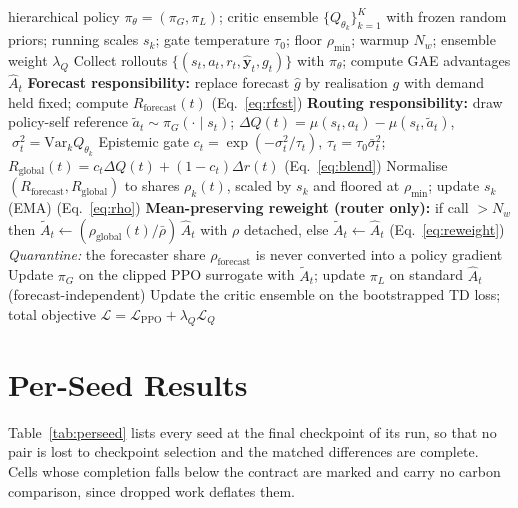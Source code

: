 \documentclass{article} %
\begin{document}
\begin{algorithm}[t]
\caption{EU-CRD training (one PPO iteration)}
\label{alg:eucrd}
\begin{algorithmic}[1]
\REQUIRE hierarchical policy $\pi_\theta=(\pi_G,\pi_L)$; critic ensemble $\{Q_{\theta_k}\}_{k=1}^{K}$ with frozen random priors; running scales $s_k$; gate temperature $\tau_0$; floor $\rho_{\min}$; warmup $N_w$; ensemble weight $\lambda_Q$
\STATE Collect rollouts $\{(s_t,a_t,r_t,\hat{\mathbf{y}}_t,g_t)\}$ with $\pi_\theta$; compute GAE advantages $\hat{A}_t$
  \STATE \textbf{Forecast responsibility:} replace forecast $\hat g$ by realisation $g$ with demand held fixed; compute $R_{\text{forecast}}(t)$ \hfill (Eq.~\ref{eq:rfcst})
  \STATE \textbf{Routing responsibility:} draw policy-self reference $\tilde a_t\!\sim\!\pi_G(\cdot\mid s_t)$; $\Delta Q(t)\!=\!\mu(s_t,a_t)\!-\!\mu(s_t,\tilde a_t)$, $\;\sigma^2_t\!=\!\mathrm{Var}_k Q_{\theta_k}$
  \STATE Epistemic gate $c_t\!=\!\exp(-\sigma^2_t/\tau_t)$, $\tau_t\!=\!\tau_0\bar\sigma^2_t$;\quad $R_{\text{global}}(t)\!=\!c_t\Delta Q(t)+(1\!-\!c_t)\Delta r(t)$ \hfill (Eq.~\ref{eq:blend})
  \STATE Normalise $(R_{\text{forecast}},R_{\text{global}})$ to shares $\rho_k(t)$, scaled by $s_k$ and floored at $\rho_{\min}$; update $s_k$ (EMA) \hfill (Eq.~\ref{eq:rho})
\ENDFOR
\STATE \textbf{Mean-preserving reweight (router only):} if call $>N_w$ then $\tilde A_t\!\leftarrow\!(\rho_{\text{global}}(t)/\bar\rho)\,\hat A_t$ with $\rho$ detached, else $\tilde A_t\!\leftarrow\!\hat A_t$ \hfill (Eq.~\ref{eq:reweight})
\STATE \emph{Quarantine:} the forecaster share $\rho_{\text{forecast}}$ is never converted into a policy gradient
\STATE Update $\pi_G$ on the clipped PPO surrogate with $\tilde A_t$; update $\pi_L$ on standard $\hat A_t$ (forecast-independent)
\STATE Update the critic ensemble on the bootstrapped TD loss; total objective $\mathcal{L}=\mathcal{L}_{\text{PPO}}+\lambda_Q\mathcal{L}_Q$
\end{algorithmic}
\end{algorithm}

\section{Per-Seed Results}
\label{app:perseed}

Table~\ref{tab:perseed} lists every seed at the final checkpoint of its run, so that no pair is lost to checkpoint selection and the matched differences are complete. Cells whose completion falls below the contract are marked and carry no carbon comparison, since dropped work deflates them.
\end{document}
